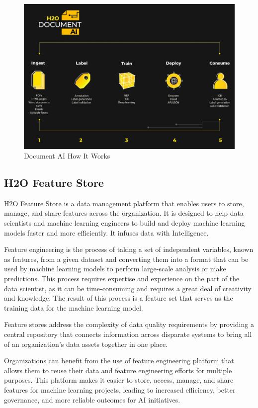 \documentclass[12pt,a4paper]{report}
\begin{document}
\begin{figure}[H]
\centering
\includegraphics[width=1\textwidth]{docai.png}
\caption{Document AI How It Works}
\end{figure}


\subsection{H2O Feature Store}

H2O Feature Store is a data management platform that enables users to store, manage, 
and share features across the organization. It is designed to help data scientists 
and machine learning engineers to build and deploy machine learning models faster 
and more efficiently. It infuses data with Intelligence.

Feature engineering is the process of taking a set of independent variables, known 
as features, from a given dataset and converting them into a format that can be used
 by machine learning models to perform large-scale analysis or make predictions. 
 This process requires expertise and experience on the part of the data scientist, 
 as it can be time-consuming and requires a great deal of creativity and knowledge.
 The result of this process is a feature set that serves as the training data 
 for the machine learning model.

Feature stores address the complexity of data quality requirements by 
providing a central repository that connects information 
across disparate systems to bring all of an organization's 
data assets together in one place.


Organizations can benefit from the use of feature engineering platform that allows 
them to reuse their data and feature engineering efforts for multiple purposes. 
This platform makes it easier to store, access, manage, and share features 
for machine learning projects, leading to increased efficiency, better governance, 
and more reliable outcomes for AI initiatives.
\end{document}
